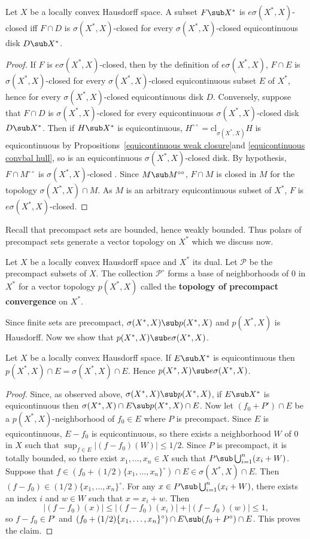 \begin{proposition}\label{LCHS esigma closed iff}
Let $X$ be a locally convex Hausdorff space. A subset $F\sub X^*$ is $e\sigma(X^*,X)$-closed iff $F\cap D$ is $\sigma(X^*,X)$-closed for every $\sigma(X^*,X)$-closed equicontinuous disk $D\sub X^*$.
\end{proposition}
\begin{proof}
If $F$ is $e\sigma(X^*,X)$-closed, then by the definition of $e\sigma(X^*,X)$, $F\cap E$ is $\sigma(X^*,X)$-closed for every $\sigma(X^*,X)$-closed equicontinuous subset $E$ of $X^*$, hence for every $\sigma(X^*,X)$-closed equicontinuous disk $D$. Conversely, suppose that $F\cap D$ is $\sigma(X^*,X)$-closed for every equicontinuous $\sigma(X^*,X)$-closed disk $D\sub X^*$. Then if $H\sub X^*$ is equicontinuous, $H^{\circ\circ}=\mathrm{cl}_{\sigma(X^*,X)}H$ is equicontinuous by Propositions~\ref{equicontinuous weak closure}and \ref{equicontinuous convbal hull}, so is an equicontinuous $\sigma(X^*,X)$-closed disk. By hypothesis, $F\cap M^{\circ\circ}$ is $\sigma(X^*,X)$-closed . Since $M\sub M^{\circ\circ}$, $F\cap M$ is closed in $M$ for the topology $\sigma(X^*,X)\cap M$. As $M$ is an arbitrary equicontinuous subset of $X^*$, $F$ is $e\sigma(X^*,X)$-closed.
\end{proof}
Recall that precompact sets are bounded, hence weakly bounded. Thus polars of precompact sets generate a vector topology on $X^*$ which we discuss now.
\begin{definition}
Let $X$ be a locally convex Hausdorff space and $X^*$ its dual. Let $\mathcal{P}$ be the precompact subsets of $X$. The collection $\mathcal{P}^\circ$ forms a base of neighborhoods of $0$ in $X^*$ for a vector topology $p(X^*,X)$ called the \textbf{topology of precompact convergence} on $X^*$.
\end{definition}
Since finite sets are precompact, $\sigma(X^*,X)\sub p(X^*,X)$ and $p(X^*,X)$ is Hausdorff. Now we show that $p(X^*,X)\sub e\sigma(X^*,X)$.
\begin{proposition}\label{LCHS precompact convergence on equicontinuous}
Let $X$ be a locally convex Hausdorff space. If $E\sub X^*$ is equicontinuous then $p(X^*,X)\cap E=\sigma(X^*,X)\cap E$. Hence $p(X^*,X)\sub e\sigma(X^*,X)$.
\end{proposition}
\begin{proof}
Since, as observed above, $\sigma(X^*,X)\sub p(X^*,X)$, if $E\sub X^*$ is equicontinuous then $\sigma(X^*,X)\cap E\sub p(X^*,X)\cap E$. Now let $(f_0+P')\cap E$ be a $p(X^*,X)$-neighborhood of $f_0\in E$ where $P$ is precompact. Since $E$ is equicontinuous, $E-f_0$ is equicontinuous, so there exists a neighborhood $W$ of $0$ in $X$ such that $\sup_{f\in E}|(f-f_0)(W)|\leq 1/2$. Since $P$ is precompact, it is totally bounded, so there exist $x_1,\dots,x_n\in X$ such that $P\sub\bigcup_{i=1}^{n}(x_i+W)$. Suppose that $f\in (f_0+(1/2)\{x_1,\dots,x_n\}^\circ)\cap E\in\sigma(X^*,X)\cap E$. Then $(f-f_0)\in(1/2)\{x_1,\dots,x_n\}^\circ$. For any $x\in P\sub\bigcup_{i=1}^{n}(x_i+W)$, there exists an index $i$ and $w\in W$ such that $x=x_i+w$. Then
\[|(f-f_0)(x)|\leq|(f-f_0)(x_i)|+|(f-f_0)(w)|\leq 1,\]
so $f-f_0\in P^\circ$ and $(f_0+(1/2)\{x_1,\dots,x_n\}^\circ)\cap E\sub(f_0+P^\circ)\cap E$. This proves the claim.
\end{proof}
